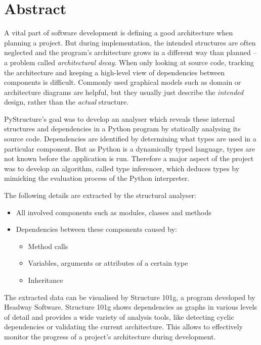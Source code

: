 \documentclass[12pt,halfparskip,DIV11,BCOR10mm]{scrreprt}
\begin{document}
\chapter*{Abstract}

A vital part of software development is defining a good architecture when planning a project. But during implementation, the intended structures are often neglected and the program's architecture grows in a different way than planned – a problem called \emph{architectural decay}. When only looking at source code, tracking the architecture and keeping a high-level view of dependencies between components is difficult. Commonly used graphical models such as domain or architecture diagrams are helpful, but they usually just describe the \emph{intended} design, rather than the \emph{actual} structure.

PyStructure's goal was to develop an analyser which reveals these internal structures and dependencies in a Python program by statically analysing its source code. Dependencies are identified by determining what types are used in a particular component. But as Python is a dynamically typed language, types are not known before the application is run. Therefore a major aspect of the project was to develop an algorithm, called type inferencer, which deduces types by mimicking the evaluation process of the Python interpreter.

The following details are extracted by the structural analyser:

\begin{itemize}
	\item All involved components such as modules, classes and methods
	\item Dependencies between these components caused by:
	\begin{itemize}
		\item Method calls
		\item Variables, arguments or attributes of a certain type
		\item Inheritance
	\end{itemize}
\end{itemize}

The extracted data can be visualised by Structure 101g, a program developed by Headway Software. Structure 101g shows dependencies as graphs in various levels of detail and provides a wide variety of analysis tools, like detecting cyclic dependencies or validating the current architecture. This allows to effectively monitor the progress of a project's architecture during development.
\end{document}
